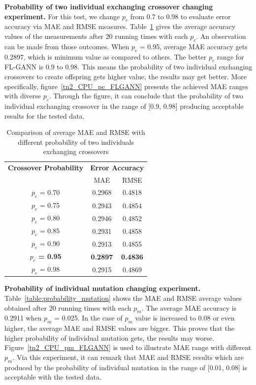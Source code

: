 \documentclass[conference]{IEEEtran}
\begin{document}
\textbf{Probability of two individual exchanging crossover changing experiment.} For this test, we change $p_c$ from 0.7 to 0.98 to evaluate error accuracy via MAE and RMSE measures. Table~\ref{table:probability_crossovers} gives the average accuracy values of the measurements after 20 running times with each $p_c$. An observation can be made from those outcomes. When $p_c$ = 0.95, average MAE accuracy gets 0.2897, which is minimum value as compared to others. The better $p_c$ range for FL-GANN is 0.9 to 0.98. This means the probability of two individual exchanging crossovers to create offspring gets higher value, the results may get better. More specifically, figure~\ref{tn2_CPU_pc_FLGANN} presents the achieved MAE ranges with diverse $p_c$. Through the figure, it can conclude that the probability of two individual exchanging crossover in the range of [0.9, 0.98] producing acceptable results for the tested data.

\begin{table}[h]
\caption{Comparison of average MAE and RMSE with different probability of two individuals exchanging crossovers} 
\begin{center}
\begin{tabular}{| c | c| c |}
\hline
\textbf{Crossover Probability} & \multicolumn{2}{c|}{\textbf{Error Accuracy}}  \\ \cline{2-3} 
& MAE & RMSE \\ [0.5ex] \hline
$p_c$ = 0.70	& 0.2968	& 0.4818		\\ \hline
$p_c$ = 0.75	& 0.2943	& 0.4854	\\ \hline
$p_c$ = 0.80	& 0.2946	& 0.4852	\\ \hline
$p_c$ = 0.85	& 0.2931	& 0.4858	\\ \hline
$p_c$ = 0.90	& 0.2913	& 0.4855		\\ \hline
\textbf{$p_c$ = 0.95}	& \textbf{0.2897}	& \textbf{0.4836}	\\ \hline
$p_c$ = 0.98	& 0.2915	& 0.4869	\\ \hline
\end{tabular}
\label{table:probability_crossovers}
\end{center}
\end{table}

\textbf{Probability of individual mutation changing experiment.} Table~\ref{table:probability_mutation} shows the MAE and RMSE average values obtained after 20 running times with each $p_m$. The average MAE accuracy is 0.2911 when $p_m$ = 0.025. In the case of $p_m$ value is increased to 0.08 or even higher, the average MAE and RMSE values are bigger. This proves that the higher probability of individual mutation gets, the results may worse. Figure~\ref{tn2_CPU_pm_FLGANN} is used to illustrate MAE range with different $p_m$. Via this experiment, it can remark that MAE and RMSE results which are produced by the probability of individual mutation in the range of [0.01, 0.08] is acceptable with the tested data. 
\end{document}
